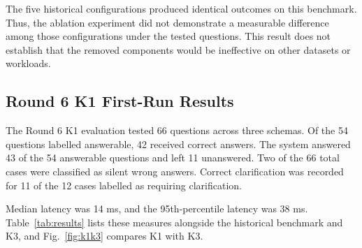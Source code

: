 \documentclass[conference]{IEEEtran}
\begin{document}
The five historical configurations produced identical outcomes on this benchmark. Thus, the ablation experiment did not demonstrate a measurable difference among those configurations under the tested questions. This result does not establish that the removed components would be ineffective on other datasets or workloads.

\subsection{Round 6 K1 First-Run Results}

The Round 6 K1 evaluation tested 66 questions across three schemas. Of the 54 questions labelled answerable, 42 received correct answers. The system answered 43 of the 54 answerable questions and left 11 unanswered. Two of the 66 total cases were classified as silent wrong answers. Correct clarification was recorded for 11 of the 12 cases labelled as requiring clarification.

Median latency was 14 ms, and the 95th-percentile latency was 38 ms. Table~\ref{tab:results} lists these measures alongside the historical benchmark and K3, and Fig.~\ref{fig:k1k3} compares K1 with K3.
\end{document}
